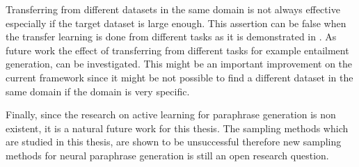 Transferring from different datasets in the same domain is not always effective especially if the target dataset is large enough. This assertion can be false when the transfer learning is done from different tasks as it is demonstrated in \cite{brad}. As future work the effect of transferring from different tasks for example entailment generation, can be investigated. This might be an important improvement on the current framework since it might be not possible to find a different dataset in the same domain if the domain is very specific.

Finally, since the research on active learning for paraphrase generation is non existent, it is a natural future work for this thesis. The sampling methods which are studied in this thesis, are shown to be unsuccessful therefore new sampling methods for neural paraphrase generation is still an open research question.